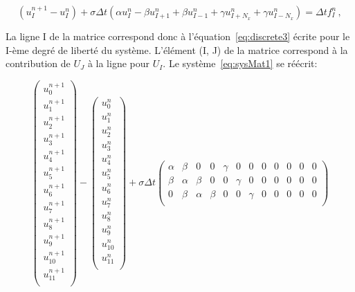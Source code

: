 \documentclass[11pt]{article}
\begin{document}
\begin{equation}
 (u^{n+1}_{I}-u^{n}_{I}) + \sigma\Delta t\left(\alpha u^{n}_{I} - \beta u^{n}_{I+1} +  \beta u^{n}_{I-1} + \gamma u^{n}_{I+N_x} +  \gamma u^{n}_{I-N_x}\right) = \Delta t f^{n}_{I} \,,
\label{eq:discrete3}
\end{equation}

La ligne I de la matrice correspond donc à l'équation~\ref{eq:discrete3} écrite pour le I-ème degré de liberté du système. L'élément (I, J) de la matrice correspond à la contribution de $U_J$ à la ligne pour $U_I$. Le système~\ref{eq:sysMat1} se réécrit:

\begin{equation}
\left(
\begin{array}{c}
u^{n+1}_{0}\\
u^{n+1}_{1}\\
u^{n+1}_{2}\\
u^{n+1}_{3}\\
u^{n+1}_{4}\\
u^{n+1}_{5}\\
u^{n+1}_{6}\\
u^{n+1}_{7}\\
u^{n+1}_{8}\\
u^{n+1}_{9}\\
u^{n+1}_{10}\\
u^{n+1}_{11}\\
\end{array}
\right)
-
\left(
\begin{array}{c}
u^{n}_{0}\\
u^{n}_{1}\\
u^{n}_{2}\\
u^{n}_{3}\\
u^{n}_{4}\\
u^{n}_{5}\\
u^{n}_{6}\\
u^{n}_{7}\\
u^{n}_{8}\\
u^{n}_{9}\\
u^{n}_{10}\\
u^{n}_{11}\\
\end{array}
\right)
+ 
\sigma \Delta t 
\begin{pmatrix}
\alpha & \beta & 0 & 0 & \gamma & 0 & 0 & 0 & 0 & 0 & 0 & 0 \\
\beta & \alpha & \beta & 0 & 0 & \gamma & 0 & 0 & 0 & 0 & 0 & 0 \\
0 & \beta & \alpha & \beta & 0 & 0 & \gamma & 0 & 0 & 0 & 0 & 0 \\

\end{pmatrix}
\end{equation}
\end{document}
